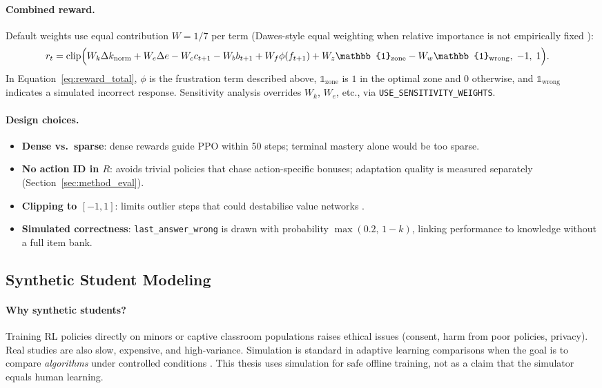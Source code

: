 \paragraph{Combined reward.}
Default weights use equal contribution $W = 1/7$ per term (Dawes-style equal weighting when relative importance is not empirically fixed \cite{dawes_improper_linear_1979}):
\begin{align}
    r_t &= \mathrm{clip}\Bigl(
        W_k \Delta k_{\mathrm{norm}}
        + W_e \Delta e
        - W_c c_{t+1}
        - W_b b_{t+1}
        + W_f \phi(f_{t+1})
        + W_z \mathbb{1}_{\mathrm{zone}}
        - W_w \mathbb{1}_{\mathrm{wrong}}
    ,\; -1,\; 1\Bigr).
    \label{eq:reward_total}
\end{align}
In Equation~\eqref{eq:reward_total}, $\phi$ is the frustration term described above, $\mathbb{1}_{\mathrm{zone}}$ is $1$ in the optimal zone and $0$ otherwise, and $\mathbb{1}_{\mathrm{wrong}}$ indicates a simulated incorrect response. Sensitivity analysis overrides $W_k$, $W_e$, etc., via \texttt{USE\_SENSITIVITY\_WEIGHTS}.

\paragraph{Design choices.}
\begin{itemize}
    \item \textbf{Dense vs.\ sparse}: dense rewards guide PPO within 50 steps; terminal mastery alone would be too sparse.
    \item \textbf{No action ID in $R$}: avoids trivial policies that chase action-specific bonuses; adaptation quality is measured separately (Section~\ref{sec:method_eval}).
    \item \textbf{Clipping to $[-1,1]$}: limits outlier steps that could destabilise value networks \cite{mnih_dqn_2015}.
    \item \textbf{Simulated correctness}: \texttt{last\_answer\_wrong} is drawn with probability $\max(0.2,\, 1-k)$, linking performance to knowledge without a full item bank.
\end{itemize}

\subsection{Synthetic Student Modeling}\label{sec:method_synthetic_student}

\paragraph{Why synthetic students?}
Training RL policies directly on minors or captive classroom populations raises ethical issues (consent, harm from poor policies, privacy). Real studies are also slow, expensive, and high-variance. Simulation is standard in adaptive learning comparisons when the goal is to compare \emph{algorithms} under controlled conditions \cite{azoulay_adaptive_2021,perez_emotions_2024,deshmukh_developing_2025}. This thesis uses simulation for safe offline training, not as a claim that the simulator equals human learning.

